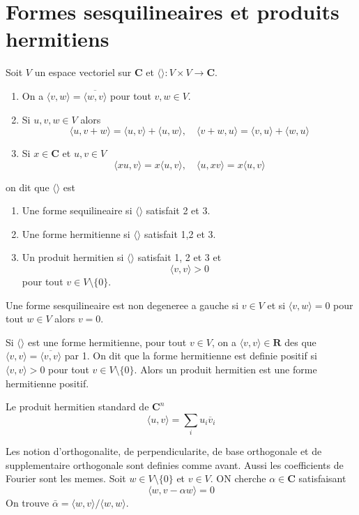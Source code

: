 \section{Formes sesquilineaires et produits hermitiens}

Soit $V$ un espace vectoriel sur $\mathbf{C}$ et $\langle  \rangle:V\times V\to \mathbf{C}$. 
\begin{enumerate}
\item On a $\langle v,w \rangle=\overline{\langle w,v \rangle}$ pour tout $v,w\in V$.
\item Si $u,v,w\in V$ alors
$$
\langle u,v+w \rangle =\langle u,v \rangle +\langle u,w \rangle,\quad \langle v+w,u \rangle =\langle v,u \rangle +\langle w,u \rangle 
$$
\item Si $x \in \mathbf{C}$ et $u,v\in V$ 
$$
\langle xu,v \rangle =x\langle u,v \rangle ,\quad \langle u,xv \rangle =x\langle u,v \rangle 
$$
\end{enumerate}
on dit que $\langle   \rangle$ est
\begin{enumerate}
\item Une forme sequilineaire si $\langle  \rangle$ satisfait 2 et 3.
\item Une forme hermitienne si $\langle  \rangle$ satisfait 1,2 et 3.
\item Un produit hermitien si $\langle  \rangle$ satisfait 1, 2 et 3 et
$$
\langle v,v \rangle >0
$$
pour tout $v\in V\setminus \{ 0 \}$.
\end{enumerate}

Une forme sesquilineaire est non degeneree a gauche si $v\in V$ et si $\langle v,w \rangle=0$ pour tout $w\in V$ alors $v=0$.

\begin{definition}
Si $\langle  \rangle$ est une forme hermitienne, pour tout $v\in V$, on a $\langle v,v \rangle\in \mathbf{R}$ des que $\langle v,v \rangle= \overline{\langle v,v \rangle}$ par 1. On dit que la forme hermitienne est definie positif si $\langle v,v \rangle>0$ pour tout $v\in V\setminus \{ 0 \}$. Alors un produit hermitien est une forme hermitienne positif.
\end{definition}
\begin{example}
Le produit hermitien standard de $\mathbf{C}^{n}$
$$
\langle u,v \rangle =\sum _{i}u_{i} \overline{v}_{i}
$$
\end{example}

Les notion d'orthogonalite, de perpendicularite, de base orthogonale et de supplementaire orthogonale sont definies comme avant. Aussi les coefficients de Fourier sont les memes. Soit $w\in V\setminus \{ 0 \}$ et $v\in V$. ON cherche $\alpha \in \mathbf{C}$ satisfaisant 
$$
\langle w,v-\alpha w \rangle =0
$$
On trouve $\bar{\alpha}=\langle w,v \rangle/\langle w,w \rangle$. 

